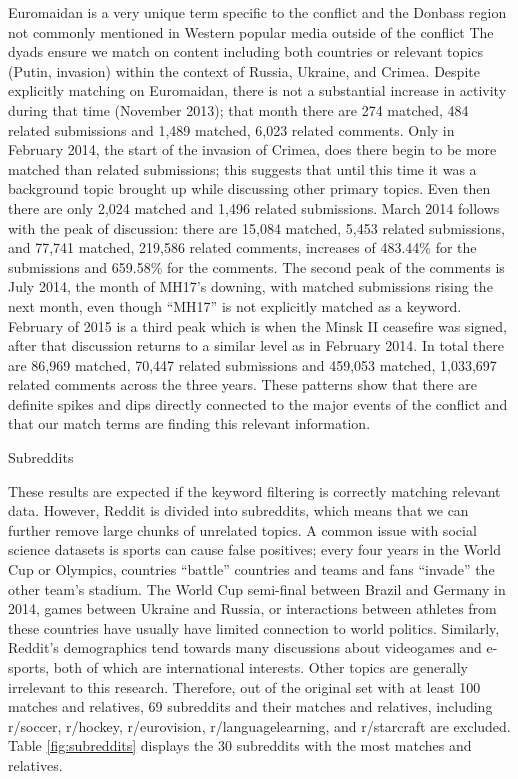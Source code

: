 Euromaidan is a very unique term specific to the conflict and the Donbass region not commonly mentioned in Western popular media outside of the conflict
The dyads ensure we match on content including both countries or relevant topics (Putin, invasion) within the context of Russia, Ukraine, and Crimea.
Despite explicitly matching on Euromaidan, there is not a substantial increase in activity during that time (November 2013); that month there are 274 matched, 484 related submissions and 1,489 matched, 6,023 related comments.
Only in February 2014, the start of the invasion of Crimea, does there begin to be more matched than related submissions; this suggests that until this time it was a background topic brought up while discussing other primary topics.
Even then there are only 2,024 matched and 1,496 related submissions.
March 2014 follows with the peak of discussion: there are 15,084 matched, 5,453 related submissions, and 77,741 matched, 219,586 related comments, increases of 483.44\% for the submissions and 659.58\% for the comments.
The second peak of the comments is July 2014, the month of MH17's downing, with matched submissions rising the next month, even though ``MH17'' is not explicitly matched as a keyword.
February of 2015 is a third peak which is when the Minsk II ceasefire was signed, after that discussion returns to a similar level as in February 2014.
In total there are 86,969 matched, 70,447 related submissions and 459,053 matched, 1,033,697 related comments across the three years.
These patterns show that there are definite spikes and dips directly connected to the major events of the conflict and that our match terms are finding this relevant information.

\begin{table}[!ht]
\centering
\caption{Subreddits}

\label{fig:subreddits}
\end{table}

These results are expected if the keyword filtering is correctly matching relevant data.
However, Reddit is divided into subreddits, which means that we can further remove large chunks of unrelated topics.
A common issue with social science datasets is sports can cause false positives; every four years in the World Cup or Olympics, countries ``battle'' countries and teams and fans ``invade'' the other team's stadium.
The World Cup semi-final between Brazil and Germany in 2014, games between Ukraine and Russia, or interactions between athletes from these countries have usually have limited connection to world politics.
Similarly, Reddit's demographics tend towards many discussions about videogames and e-sports, both of which are international interests.
Other topics are generally irrelevant to this research.
Therefore, out of the original set with at least 100 matches and relatives, 69 subreddits and their matches and relatives, including r/soccer, r/hockey, r/eurovision, r/languagelearning, and r/starcraft are excluded.
Table \ref{fig:subreddits} displays the 30 subreddits with the most matches and relatives.

